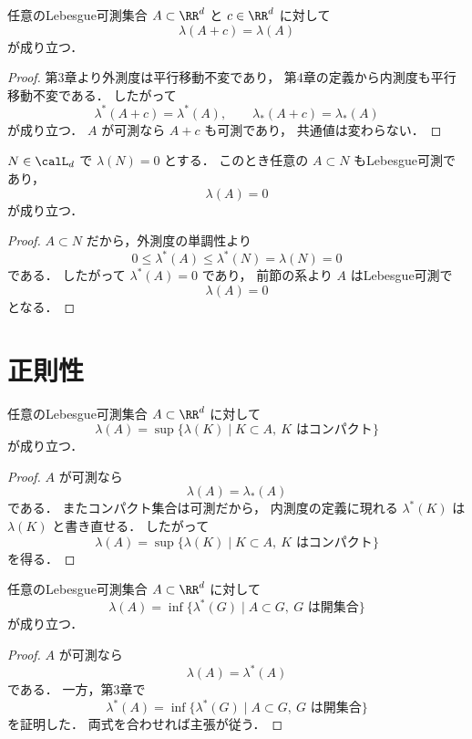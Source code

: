 \begin{proposition}[平行移動不変性]
任意のLebesgue可測集合 $A \subset \RR^d$ と $c \in \RR^d$ に対して
\[
\lambda(A+c)=\lambda(A)
\]
が成り立つ．
\end{proposition}
\begin{proof}
第3章より外測度は平行移動不変であり，
第4章の定義から内測度も平行移動不変である．
したがって
\[
\lambda^*(A+c)=\lambda^*(A),\qquad
\lambda_*(A+c)=\lambda_*(A)
\]
が成り立つ．
$A$ が可測なら $A+c$ も可測であり，
共通値は変わらない．
\end{proof}

\begin{corollary}[零集合の部分集合]
$N \in \calL_d$ で $\lambda(N)=0$ とする．
このとき任意の $A \subset N$ もLebesgue可測であり，
\[
\lambda(A)=0
\]
が成り立つ．
\end{corollary}
\begin{proof}
$A \subset N$ だから，外測度の単調性より
\[
0\le \lambda^*(A)\le \lambda^*(N)=\lambda(N)=0
\]
である．
したがって $\lambda^*(A)=0$ であり，
前節の系より $A$ はLebesgue可測で
\[
\lambda(A)=0
\]
となる．
\end{proof}

\section{正則性}

\begin{theorem}[内正則性]
任意のLebesgue可測集合 $A \subset \RR^d$ に対して
\[
\lambda(A)
=
\sup\{\lambda(K)\mid K \subset A,\ K \text{ はコンパクト}\}
\]
が成り立つ．
\end{theorem}
\begin{proof}
$A$ が可測なら
\[
\lambda(A)=\lambda_*(A)
\]
である．
またコンパクト集合は可測だから，
内測度の定義に現れる $\lambda^*(K)$ は $\lambda(K)$ と書き直せる．
したがって
\[
\lambda(A)
=
\sup\{\lambda(K)\mid K \subset A,\ K \text{ はコンパクト}\}
\]
を得る．
\end{proof}

\begin{theorem}[外正則性]
任意のLebesgue可測集合 $A \subset \RR^d$ に対して
\[
\lambda(A)
=
\inf\{\lambda^*(G)\mid A \subset G,\ G \text{ は開集合}\}
\]
が成り立つ．
\end{theorem}
\begin{proof}
$A$ が可測なら
\[
\lambda(A)=\lambda^*(A)
\]
である．
一方，第3章で
\[
\lambda^*(A)
=
\inf\{\lambda^*(G)\mid A \subset G,\ G \text{ は開集合}\}
\]
を証明した．
両式を合わせれば主張が従う．
\end{proof}

